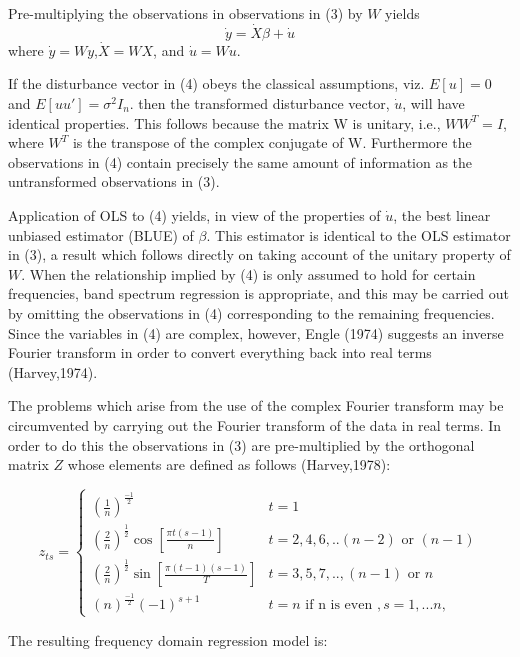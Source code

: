 \documentclass{article}\usepackage[]{graphicx}\usepackage[]{color}
\begin{document}
Pre-multiplying the observations in  observations in (3) by $W$ yields
\begin{equation}
    \dot y=\dot X\beta+\dot u
    \end{equation}
where $\dot y = Wy$,$ \dot X = WX$, and $ \dot u = Wu$.

If the disturbance vector in (4) obeys the classical assumptions, viz. $E[u] = 0$ and $E[uu']=\sigma^2 I_n$. then the transformed disturbance vector, $\dot u$, will have identical properties. This follows because the matrix W is unitary, i.e., $WW^{T}= I$, where $W^T$ is the transpose of the complex conjugate of W. Furthermore the observations in (4) contain precisely the same amount of information as the untransformed observations in (3).

Application of OLS to (4) yields, in view of the properties of  $\dot u$, the best linear unbiased estimator (BLUE) of $\beta$. This estimator is identical to the OLS estimator in (3), a result which follows directly on taking account of the unitary property of $W$. When the relationship implied by (4) is only assumed to hold for certain frequencies, band spectrum regression is appropriate, and this may be carried out by omitting the observations in (4) corresponding to the remaining frequencies. Since the variables in (4) are complex, however, Engle (1974) suggests an inverse Fourier transform in order to convert everything back into real terms  (Harvey,1974). 

The problems which arise from the use of the complex Fourier transform may be circumvented by carrying out the Fourier transform of the data in real terms. In order to do this the observations in (3) are pre-multiplied by the orthogonal matrix $Z$ whose elements are defined as follows (Harvey,1978):


$$z_{ts} = \left\lbrace
\begin{array}{ll}
\left(\frac{1}n\right) ^\frac{-1}2 &  t=1\\
\left(\frac{2}n\right) ^\frac{1}2 \cos\left[\frac{\pi t(s-1)}n\right] & t=2,4,6,..(n-2) \mbox{ or }   (n-1)\\
\left(\frac{2}n\right) ^\frac{1}2 \sin\left[\frac{\pi (t-1)(s-1)}T\right] & t=3,5,7,.., (n-1)  \mbox{ or }   n\\
\left (n\right) ^\frac{-1}2 (-1)^{s+1} & t=n \mbox{  if  n  is  even } ,  s=1,...n,
\end{array}
\right.$$


The resulting frequency domain regression model is:
\end{document}
